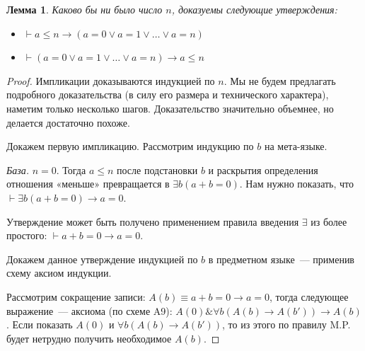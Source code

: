 \documentclass[a4paper,11pt]{article}
\newtheorem{lmm}[thm]{Лемма}
\theoremstyle{definition}
\newcommand{\proves}{\vdash}
\newcommand{\amp}{\mathbin{\&}}
\begin{document}
\begin{lmm}
Каково бы ни было число $n$, доказуемы следующие утверждения:
\begin{itemize}
\item $\proves a \le n \to (a = 0 \vee a = 1 \vee \dots \vee a = n)$
\item $\proves (a = 0 \vee a = 1 \vee \dots \vee a = n) \to a \le n$
\end{itemize}
\end{lmm}
\begin{proof}
Импликации доказываются индукцией по $n$. Мы не будем предлагать подробного
доказательства (в силу его размера и технического характера), наметим только
несколько шагов. Доказательство значительно объемнее, но делается достаточно
похоже.

Докажем первую импликацию. Рассмотрим индукцию по $b$ на мета-языке.

\emph{База.} $n = 0$. Тогда $a \le n$ после подстановки $b$ и раскрытия
определения отношения «меньше» превращается в $\exists b(a + b = 0)$. Нам нужно
показать, что $\proves \exists b(a + b = 0) \to a = 0$.

Утверждение может быть получено применением правила введения $\exists$ из более
простого: $\proves a + b = 0 \to a = 0$.

Докажем данное утверждение индукцией по $b$ в предметном языке~--- применив
схему аксиом индукции.

Рассмотрим сокращение записи: $A(b) \equiv a + b = 0 \to a = 0$, тогда
следующее выражение~--- аксиома (по схеме A9): $A(0) \amp \forall b(A(b) \to
A(b')) \to A(b)$. Если показать $A(0)$ и $\forall b(A(b) \to A(b'))$, то из
этого по правилу M.P. будет нетрудно получить необходимое $A(b)$.


\end{proof}
\end{document}
